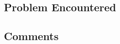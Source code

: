 \documentclass[11pt,a4paper,notitlepage]{article}
\newcommand{\explanation}[1]{}  %
\begin{document}
\subsection{Problem Encountered}
\explanation{
Describe any serious problems you encountered.                    }



\subsection{Comments}
\explanation{
List any other comments here. Feel free to provide any feedback   
on how much you learned from doing the assignment, and whether    
you enjoyed doing it.}
\end{document}
